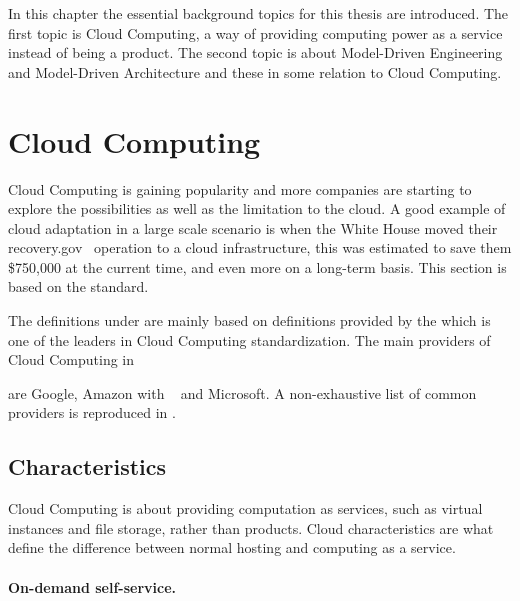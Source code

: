 
In this chapter the essential background topics for this thesis are introduced.
The first topic is Cloud Computing, a way of providing computing power as a service
instead of being a product.
The second topic is about Model-Driven Engineering and Model-Driven Architecture
and these in some relation to Cloud Computing.

\section{Cloud Computing}


Cloud Computing is gaining popularity and more companies are starting 
to explore the possibilities as well as the limitation to the cloud.
A good example of cloud adaptation in a large scale scenario is when
the White House moved their recovery.gov~\cite{recovery} operation to
a cloud infrastructure, this was estimated to save them \$750,000
at the current time, and even more on a long-term basis.
This section is based on the  standard.

The definitions under are mainly based on definitions provided by 
the  which is one of the leaders in Cloud Computing standardization.
The main providers of Cloud Computing in \date{April 2012}
are Google, Amazon with ~\cite{aws} and Microsoft.
A non-exhaustive list of common providers is reproduced in .

\subsection{Characteristics}

Cloud Computing is about providing computation as services\cite{nist:mell11}, 
such as virtual instances and file storage, rather than products. 
Cloud characteristics are what define
the difference between normal hosting and computing as a service.

\paragraph{On-demand self-service.} 

